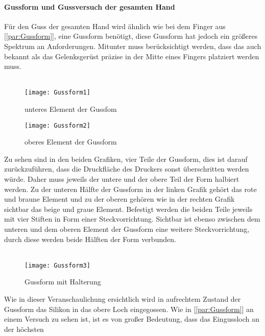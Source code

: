 \documentclass[titlepage,12pt,twoside]{article}
\begin{document}
\paragraph{Gussform und Gussversuch der gesamten Hand}
\hfill \break
\hfill \break
Für den Guss der gesamten Hand wird ähnlich wie bei dem Finger aus [\textcolor{blue}{\autoref{par:Gussform}}], eine Gussform benötigt, diese Gussform hat jedoch ein größeres Spektrum an Anforderungen. Mitunter muss berücksichtigt werden, dass das  auch 
bekannt als das Gelenksgerüst präzise in der Mitte eines Fingers platziert werden muss. \\
\\
\begin{figure}[H]
	\begin{center}
		\scalebox{0.8}
		{\texttt{[image: Gussform1]}}
		\caption{unteres Element der Gussfom}
		\label{fig:Gussform1}			
	\end{center}
\end{figure}
\begin{figure}[H]
	\begin{center}
		\scalebox{0.8}
		{\texttt{[image: Gussform2]}}
		\caption{oberes Element der Gussform}
		\label{fig:Gussform2}			
	\end{center}
\end{figure}
\hfill \break
Zu sehen sind in den beiden Grafiken, vier Teile der Gussform, dies ist darauf zurückzuführen, dass die Druckfläche des Druckers sonst überschritten werden würde. Daher muss jeweils der untere und der obere Teil der Form halbiert werden. Zu der 
unteren Hälfte der Gussform in der linken Grafik gehört das rote und braune Element und zu der oberen gehören wie in der rechten Grafik sichtbar das beige und graue Element. Befestigt werden die beiden Teile jeweils mit vier Stiften in Form einer 
Steckvorrichtung. Sichtbar ist ebenso zwischen dem unteren und dem oberen Element der Gussform eine weitere Steckvorrichtung, durch diese werden beide Hälften der Form verbunden. \\
\\
\begin{figure}[H]
	\begin{center}
		\scalebox{0.8}
		{\texttt{[image: Gussform3]}}
		\caption{Gussform mit Halterung}
		\label{fig:Gussform3}			
	\end{center}
\end{figure}
\hfill \break
Wie in dieser Veranschaulichung ersichtlich wird in aufrechtem Zustand der Gussform das Silikon in das obere Loch eingegossen. Wie in [\textcolor{blue}{\autoref{par:Gussform}}] an einem Versuch zu sehen ist, ist es von großer Bedeutung, dass das Eingussloch an der höchsten 
\end{document}
